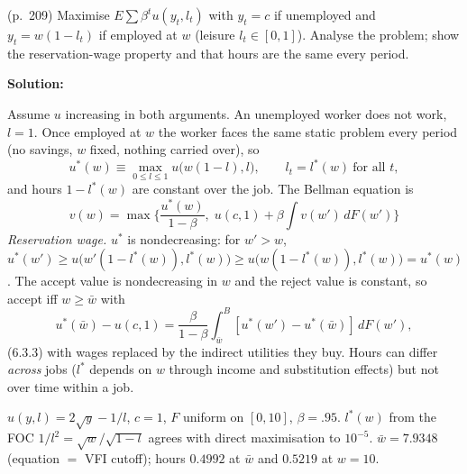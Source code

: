 \documentclass[12pt, letterpaper]{article}
\newcommand{\wb}{\bar w}
\begin{document}
\begin{tcolorbox}[oddbox,title={Exercise 6.7 \quad Variable Labor Supply}]
\begin{tcolorbox}[questionbox]
(p.~209) Maximise $E\sum\beta^tu(y_t,l_t)$ with $y_t=c$ if unemployed and $y_t=w(1-l_t)$ if employed at $w$
(leisure $l_t\in[0,1]$). Analyse the problem; show the reservation-wage property and that hours are the
same every period.
\end{tcolorbox}

\textbf{Solution:}

Assume $u$ increasing in both arguments. An unemployed worker does not work, $l=1$. Once employed at $w$
the worker faces the same static problem every period (no savings, $w$ fixed, nothing carried over), so
\[
u^*(w)\equiv\max_{0\le l\le1}u\big(w(1-l),l\big),\qquad l_t=l^*(w)\ \text{for all }t,
\]
and hours $1-l^*(w)$ are constant over the job. The Bellman equation is
\[
\boxed{v(w)=\max\Big\{\frac{u^*(w)}{1-\beta},\;u(c,1)+\beta\int v(w')\,dF(w')\Big\}}
\]
\emph{Reservation wage.} $u^*$ is nondecreasing: for $w'>w$,
$u^*(w')\ge u\big(w'(1-l^*(w)),l^*(w)\big)\ge u\big(w(1-l^*(w)),l^*(w)\big)=u^*(w)$. The accept value is
nondecreasing in $w$ and the reject value is constant, so accept iff $w\ge\wb$ with
\[
u^*(\wb)-u(c,1)=\frac{\beta}{1-\beta}\int_{\wb}^B[u^*(w')-u^*(\wb)]\,dF(w'),
\]
(6.3.3) with wages replaced by the indirect utilities they buy. Hours can differ \emph{across} jobs
($l^*$ depends on $w$ through income and substitution effects) but not over time within a job.

\begin{tcolorbox}[databox]
$u(y,l)=2\sqrt y-1/l$, $c=1$, $F$ uniform on $[0,10]$, $\beta=.95$. $l^*(w)$ from the FOC $1/l^2=\sqrt w/\sqrt{1-l}$
agrees with direct maximisation to $10^{-5}$. $\wb=7.9348$ (equation $=$ VFI cutoff); hours $0.4992$ at
$\wb$ and $0.5219$ at $w=10$.
\end{tcolorbox}
\end{tcolorbox}
\end{document}
